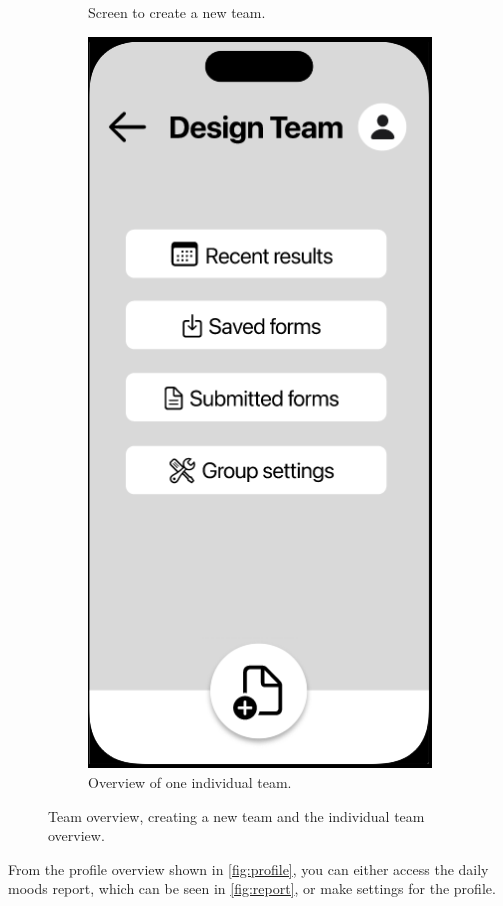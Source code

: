 \documentclass[11pt]{article}
\begin{document}
\begin{figure}[h!]
\begin{subfigure}[b]{0.3\textwidth}
         \caption{Screen to create a new team.}
         \label{fig:newTeam}
     \end{subfigure}
          \hfill
     \begin{subfigure}[b]{0.3\textwidth}
         \centering
         \includegraphics[width=\textwidth]{figures/team.PNG}
         \caption{Overview of one individual team.}
         \label{fig:individualTeam}
     \end{subfigure}
        \caption{Team overview, creating a new team and the individual team overview.}
\end{figure}
From the profile overview shown in \autoref{fig:profile}, you can either access the daily moods report, which can be seen in \autoref{fig:report}, or make settings for the profile. 
\end{document}
